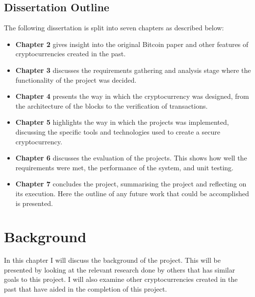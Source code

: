 \documentclass{l4proj}
\begin{document}
\section{Dissertation Outline}
The following dissertation is split into seven chapters as described below:
\begin{itemize}
    \item
        \textbf{Chapter 2} gives insight into the original Bitcoin paper and other features of cryptocurrencies
        created in the past.
    \item
        \textbf{Chapter 3} discusses the requirements gathering and analysis stage where the functionality
        of the project was decided.
    \item
        \textbf{Chapter 4} presents the way in which the cryptocurrency was designed, from the architecture of the blocks
        to the verification of transactions.
    \item
        \textbf{Chapter 5} highlights the way in which the projects was implemented, discussing the specific tools and 
        technologies used to create a secure cryptocurrency.
    \item
        \textbf{Chapter 6} discusses the evaluation of the projects. This shows how well the requirements were met, the
        performance of the system, and unit testing.
    \item
        \textbf{Chapter 7} concludes the project, summarising the project and reflecting on its execution. Here the
        outline of any future work that could be accomplished is presented.
\end{itemize}


\chapter{Background}
In this chapter I will discuss the background of the project. This will be presented by looking at the relevant research done by 
others that has similar goals to this project. I will also examine other cryptocurrencies created in the past that have aided 
in the completion of this project.

\end{document}
